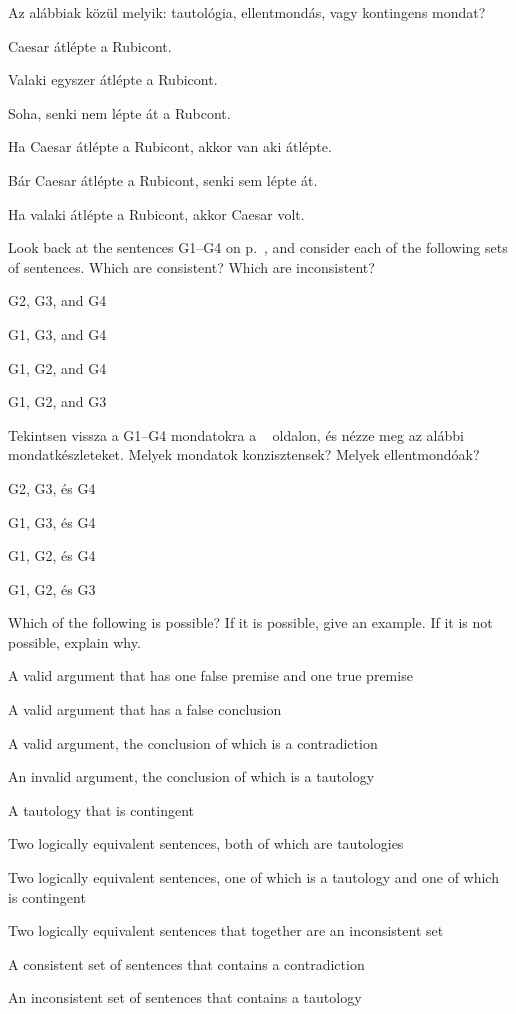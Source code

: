 \problempart
\label{pr.EnglishTautology}
Az alábbiak közül melyik: tautológia, ellentmondás, vagy kontingens mondat?
\begin{earg}
\item Caesar átlépte a Rubicont.
\item Valaki egyszer átlépte a Rubicont.
\item Soha, senki nem lépte át a Rubcont.
\item Ha Caesar átlépte a Rubicont, akkor van aki átlépte.
\item Bár Caesar átlépte a Rubicont, senki sem lépte át.
\item Ha valaki átlépte a Rubicont, akkor Caesar volt.
\end{earg}

\solutions
\problempart
\label{pr.MartianGiraffes}
Look back at the sentences G1--G4 on p.~\pageref{MartianGiraffes}, and consider each of the following sets of sentences. Which are consistent? Which are inconsistent?
\begin{earg}
\item G2, G3, and G4
\item G1, G3, and G4
\item G1, G2, and G4
\item G1, G2, and G3
\end{earg}

\solutions
\problempart
\label{pr.MartianGiraffes}
Tekintsen vissza a G1--G4 mondatokra a ~\pageref{MartianGiraffes} oldalon, és nézze meg az alábbi mondatkészleteket. Melyek mondatok konzisztensek? Melyek ellentmondóak?
\begin{earg}
\item G2, G3, és G4
\item G1, G3, és G4
\item G1, G2, és G4
\item G1, G2, és G3
\end{earg}


\solutions
\problempart
\label{pr.EnglishCombinations}
Which of the following is possible? If it is possible, give an example. If it is not possible, explain why.
\begin{earg}
\item A valid argument that has one false premise and one true premise
\item A valid argument that has a false conclusion
\item A valid argument, the conclusion of which is a contradiction
\item An invalid argument, the conclusion of which is a tautology
\item A tautology that is contingent
\item Two logically equivalent sentences, both of which are tautologies
\item Two logically equivalent sentences, one of which is a tautology and one of which is contingent
\item Two logically equivalent sentences that together are an inconsistent set
\item A consistent set of sentences that contains a contradiction
\item An inconsistent set of sentences that contains a tautology
\end{earg}

